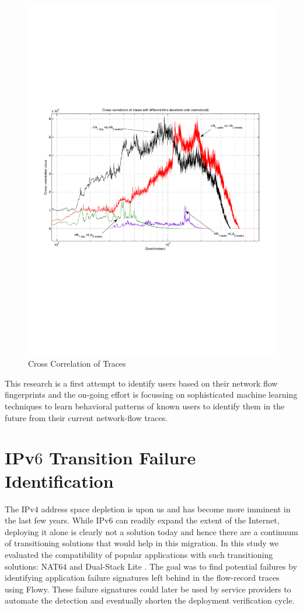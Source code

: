 \begin{figure}[h!]
\begin{center}
  \includegraphics* [width=0.6\linewidth]{figures/cybermetrics-cross-correlate}
  \caption{Cross Correlation of Traces
					 \cite{nmelnikov:thesis:2010}}
  \label{fig:cybermetrics-cross-correlate}
\end{center}
\end{figure}

This research is a first attempt to identify users based on their network flow fingerprints and the on-going effort is focussing on sophisticated machine learning techniques to learn behavioral patterns of known users to identify them in the future from their current network-flow traces.

\section{IPv$6$ Transition Failure Identification}\label{sec:ipv6transeval}
The IPv$4$ address space depletion is upon us and has become more imminent in the last few years. While IPv$6$ can readily expand the extent of the Internet, deploying it alone is clearly not a solution today and hence there are a continuum of transitioning solutions that would help in this migration. In this study \cite{vbajpai:2012} we evaluated the compatibility of popular applications with such transitioning solutions: NAT$64$ \cite{rfc6146} and Dual-Stack Lite \cite{rfc6333}. The goal was to find potential failures by identifying application failure signatures left behind in the flow-record traces using Flowy. These failure signatures could later be used by service providers to automate the detection and eventually shorten the deployment verification cycle.

